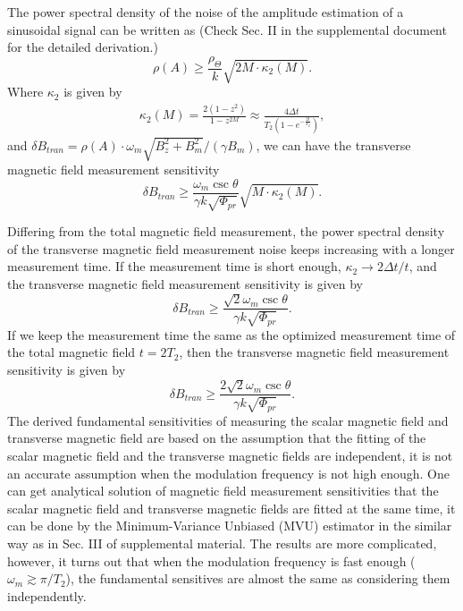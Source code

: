 \documentclass[prx,twocolumn,10pt,nofootinbib]{revtex4-1}
\begin{document}
The power spectral density of the noise of the amplitude estimation of a sinusoidal signal can be written as (Check Sec. II in the supplemental document for the detailed derivation.)
\begin{equation}
    \rho(A) \geq \frac{\rho_{\Theta}}{k}\sqrt{2 M \cdot \kappa_2(M)}.
    \label{eq:rho_A}
\end{equation}
Where $\kappa_2$ is given by
\begin{equation}
    \begin{aligned}
    \kappa_2(M) = \frac{2(1-z^2)}{1-z^{2M}} \approx \frac{4 \Delta t}{T_2(1-e^{-\frac{2t}{T_2}})},
    \end{aligned}
\end{equation}
and $\delta B_{tran} = \rho(A) \cdot \omega_m \sqrt{B_z^2+B_m^2}/(\gamma B_m)$, we can have the transverse magnetic field measurement sensitivity
\begin{equation}
	\delta B_{tran} \geq \frac{\omega_m \csc \theta }{\gamma k \sqrt{ \Phi_{pr}}}\sqrt{ M \cdot \kappa_2(M)}.
\end{equation}


Differing from the total magnetic field measurement, the power spectral density of the transverse magnetic field measurement noise keeps increasing with a longer measurement time. If the measurement time is short enough, $\kappa_2 \rightarrow 2\Delta t/t$, and the transverse magnetic field measurement sensitivity is given by
\begin{equation}
	\delta B_{tran} \geq \frac{\sqrt{2} \omega_m \csc \theta }{\gamma k \sqrt{\Phi_{pr}}}.
\end{equation}
If we keep the measurement time the same as the optimized measurement time of the total magnetic field $t=2T_2$, then the transverse magnetic field measurement sensitivity is given by
\begin{equation}
	\delta B_{tran} \geq \frac{2\sqrt{2} \omega_m \csc \theta }{\gamma k \sqrt{\Phi_{pr}}}.
\end{equation}
The derived fundamental sensitivities of measuring the scalar magnetic field and transverse magnetic field are based on the assumption that the fitting of the scalar magnetic field and the transverse magnetic fields are independent, it is not an accurate assumption when the modulation frequency is not high enough. One can get analytical solution of magnetic field measurement sensitivities that the scalar magnetic field and transverse magnetic fields are fitted at the same time, it can be done by the Minimum-Variance Unbiased (MVU) estimator in the similar way as in Sec. III of supplemental material. The results are more complicated, however, it turns out that when the modulation frequency is fast enough 
($\omega_m \gtrsim \pi/T_2$), the fundamental sensitives are almost the same as considering them independently.
\end{document}
